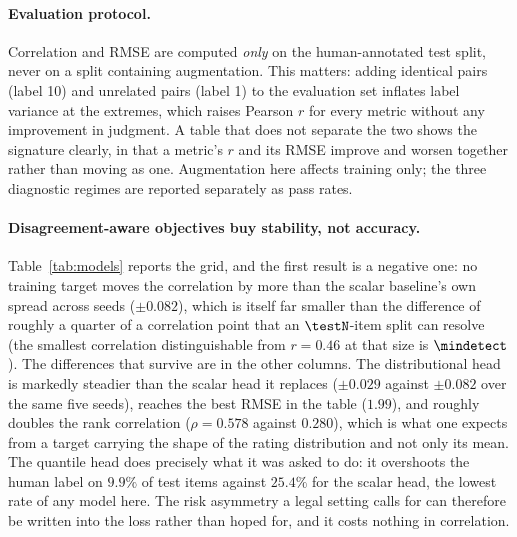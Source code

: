 \documentclass[11pt]{article}
\begin{document}
\paragraph{Evaluation protocol.} Correlation and RMSE are computed \emph{only}
on the human-annotated test split, never on a split containing augmentation.
This matters: adding identical pairs (label 10) and unrelated pairs (label 1) to
the evaluation set inflates label variance at the extremes, which raises Pearson
$r$ for every metric without any improvement in judgment. A table that does not
separate the two shows the signature clearly, in that a metric's $r$ and its
RMSE improve and worsen together rather than moving as one. Augmentation here
affects training only; the three diagnostic regimes are reported separately as
pass rates.

\begin{table}[t]\centering\small

\caption{Trained metrics, mean over 5 seeds, evaluated on the human-annotated
test split only. \emph{ident.}\ and \emph{unrel.}\ are the two sanity checks in
current use; \textsc{LexFlip} false-acceptance is the share of legally flipped
pairs still scored $\geq 7$ (``accurate'' under the published rubric). The
margin is the quantity defined in Section~2 of the main paper. It is shown as `--'
where a model places the identical and unrelated probes within one point of
each other, because a model with no working range has none to spend on the
edit.}
\label{tab:models}
\end{table}

\paragraph{Disagreement-aware objectives buy stability, not accuracy.}
Table~\ref{tab:models} reports the grid, and the first result is a negative one:
no training target moves the correlation by more than the scalar baseline's own
spread across seeds ($\pm0.082$), which is itself far smaller than the
difference of roughly a quarter of a correlation point that an $\testN$-item
split can resolve (the smallest correlation
distinguishable from $r=0.46$ at that size is $\mindetect$). The differences that survive are in the other columns. The
distributional head is markedly steadier than the scalar head it replaces
($\pm0.029$ against $\pm0.082$ over the same five seeds), reaches the best RMSE
in the table ($1.99$), and roughly doubles the rank correlation ($\rho=0.578$
against $0.280$), which is what one expects from a target carrying the shape of
the rating distribution and not only its mean. The quantile head does precisely
what it was asked to do: it overshoots the human label on $9.9\%$ of test items
against $25.4\%$ for the scalar head, the lowest rate of any model here. The
risk asymmetry a legal setting calls for can therefore be written into the loss
rather than hoped for, and it costs nothing in correlation.
\end{document}
